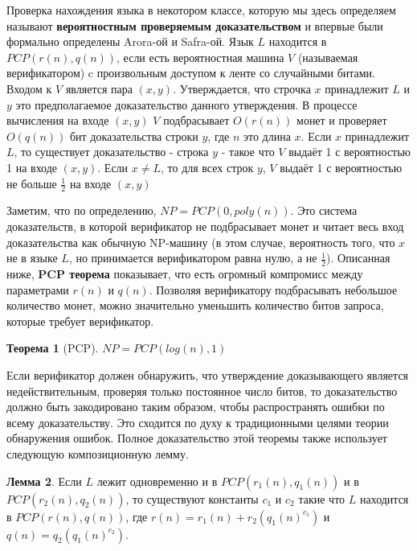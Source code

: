 \documentclass{article}
\newcommand{\blank} {
\newline
\newline
}
\theoremstyle{definition}
\newtheorem{theorem}{Теорема}[section]
\newtheorem{lemma}[theorem]{Лемма}
\begin{document}
\blank
Проверка нахождения языка в некотором классе, которую мы здесь определяем называют \textbf{вероятностным проверяемым доказательством} и впервые были формально определены Arora-ой и Safra-ой. Язык $L$  находится в $PCP(r(n), q(n))$, если есть вероятностная машина $V$ (называемая верификатором) c произвольным доступом к ленте со случайными битами. Входом к $V$ является пара $(x, y)$. Утверждается, что строчка $x$ принадлежит $L$ и $y$ это предполагаемое доказательство данного утверждения. В процессе вычисления на входе $(x, y)$ $V$ подбрасывает $O(r(n))$ монет и проверяет $O(q(n))$ бит доказательства строки $y$, где $n$ это длина $x$. Если $x$ принадлежит $L$, то существует доказательство - строка $y$ - такое что $V$ выдаёт 1 с вероятностью 1 на входе $(x, y)$. Если $x \neq L$, то для всех строк $y$, $V$ выдаёт 1 с вероятностью не больше $ \frac{1}{2} $ на входе $(x, y)$
\blank
Заметим, что по определению, $NP = PCP(0, poly(n))$. Это система доказательств, в которой верификатор не подбрасывает монет и читает весь вход доказательства как обычную NP-машину (в этом случае, вероятность того, что $x$ не в языке $L$, но принимается верификатором равна нулю, а не $\frac{1}{2}$). Описанная ниже, \textbf{PCP теорема} показывает, что есть огромный компромисс между параметрами $r(n)$ и $q(n)$. Позволяя верификатору подбрасывать небольшое количество монет, можно значительно уменьшить количество битов запроса, которые требует верификатор.
\blank

\begin{theorem}[PCP]
\label{pythagorean}
$NP = PCP(log(n),1)$
\end{theorem}

\noindent Если верификатор должен обнаружить, что утверждение доказывающего является недействительным, проверяя только постоянное число битов, то доказательство должно быть закодировано таким образом, чтобы распространять ошибки по всему доказательству. Это сходится по духу к традиционными целями теории обнаружения ошибок. Полное доказательство этой теоремы также использует следующую композиционную лемму.

\begin{lemma}
Если $L$ лежит одновременно и в $PCP(r_1(n),q_1(n))$ и в $PCP(r_2(n),q_2(n))$, то существуют константы $c_1$ и $c_2$ такие что $L$ находится в $PCP(r(n), q(n))$, где $r(n) = r_1(n)+r_2(q_1(n)^{c_1})$ и $q(n) = q_2(q_1(n)^{c_2})$.
\end{lemma}
\end{document}
